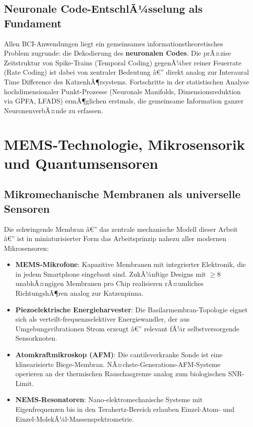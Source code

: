 ﻿\documentclass[12pt,a4paper,titlepage]{report}
\begin{document}
\subsection{Neuronale Code-EntschlÃ¼sselung als Fundament}

Allen BCI-Anwendungen liegt ein gemeinsames informationstheoretisches Problem
zugrunde: die Dekodierung des \textbf{neuronalen Codes}. Die prÃ¤zise Zeitstruktur
von Spike-Trains (Temporal Coding) gegenÃ¼ber reiner Feuerrate (Rate Coding) ist
dabei von zentraler Bedeutung â€” direkt analog zur Interaural Time Difference
des KatzenhÃ¶rsystems. Fortschritte in der statistischen Analyse hochdimensionaler
Punkt-Prozesse (Neuronale Manifolds,
Dimensionsreduktion via GPFA, LFADS) ermÃ¶glichen erstmals, die gemeinsame Information
ganzer NeuronenverbÃ¤nde zu erfassen.

\section{MEMS-Technologie, Mikrosensorik und Quantumsensoren}

\subsection{Mikromechanische Membranen als universelle Sensoren}

Die schwingende Membran â€” das zentrale mechanische Modell dieser Arbeit â€” ist in
miniaturisierter Form das Arbeitsprinzip nahezu aller modernen Mikrosensoren:
\begin{itemize}[leftmargin=2em]
    \item \textbf{MEMS-Mikrofone}: Kapazitive Membranen mit integrierter
        Elektronik, die in jedem Smartphone eingebaut sind. ZukÃ¼nftige Designs
        mit $\geq 8$ unabhÃ¤ngigen Membranen pro Chip realisieren rÃ¤umliches
        RichtungshÃ¶ren analog zur Katzenpinna.
    \item \textbf{Piezoelektrische Energieharvester}: Die Basilarmembran-Topologie
        eignet sich als verteilt-frequenzselektiver Energiewandler, der aus
        Umgebungsvibrationen Strom erzeugt â€” relevant fÃ¼r selbstversorgende
        Sensorknoten.
    \item \textbf{Atomkraftmikroskop (AFM)}: Die cantileverkranke Sonde ist eine
        klinearisierte Biege-Membran. NÃ¤chste-Generations-AFM-Systeme operieren
        an der thermischen Rauschasgrenze analog zum biologischen SNR-Limit.
    \item \textbf{NEMS-Resonatoren}: Nano-elektromechanische Systeme mit
        Eigenfrequenzen bis in den Terahertz-Bereich erlauben Einzel-Atom-
        und Einzel-MolekÃ¼l-Massenspektro\-metrie.
\end{itemize}
\end{document}
